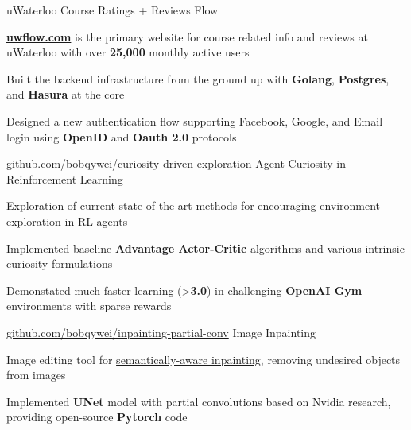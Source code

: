 
\begin{cventries}
  \cventry
    {uWaterloo Course Ratings + Reviews} %
    {Flow} %
    {} %
    {} %
    {
      \begin{cvitems} %
        \item {\href{https://uwflow.com}{\textbf{uwflow.com}} is the primary website for course related info and reviews at uWaterloo with over \textbf{25,000} monthly active users}
        \item {Built the backend infrastructure from the ground up with \textbf{Golang}, \textbf{Postgres}, and \textbf{Hasura} at the core}
        \item {Designed a new authentication flow supporting Facebook, Google, and Email login using \textbf{OpenID} and \textbf{Oauth 2.0} protocols}
      \end{cvitems}
    }

  \cventry
    {\href{https://github.com/bobqywei/curiosity-driven-exploration}{github.com/bobqywei/curiosity-driven-exploration}} %
    {Agent Curiosity in Reinforcement Learning} %
    {} %
    {} %
    {
      \begin{cvitems} %
      	\item {Exploration of current state-of-the-art methods for encouraging environment exploration in RL agents}
      	\item {Implemented baseline \textbf{Advantage Actor-Critic} algorithms and various \underline{intrinsic curiosity} formulations}
      	\item {Demonstated much faster learning (>\textbf{3.0\times}) in challenging \textbf{OpenAI Gym} environments with sparse rewards}
      \end{cvitems}
    }

  \cventry
    {\href{https://github.com/bobqywei/inpainting-partial-conv}{github.com/bobqywei/inpainting-partial-conv}} %
    {Image Inpainting} %
    {} %
    {} %
    {
      \begin{cvitems} %
        \item {Image editing tool for \underline{semantically-aware inpainting}, removing undesired objects from images}
        \item {Implemented \textbf{UNet} model with partial convolutions based on Nvidia research, providing open-source \textbf{Pytorch} code}
      \end{cvitems}
    }
\end{cventries}